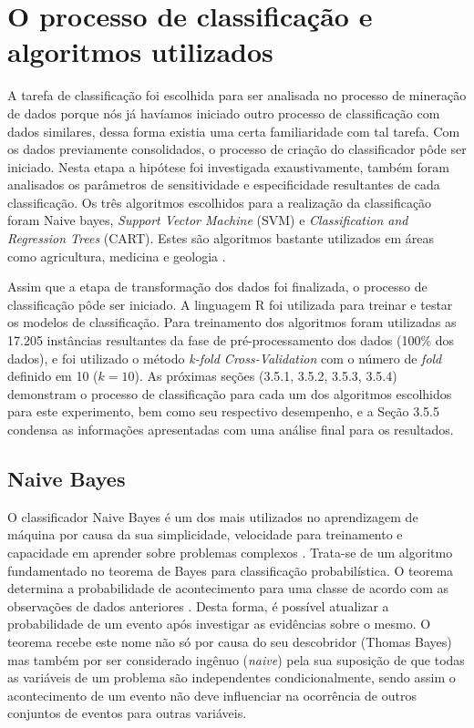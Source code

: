 \section{O processo de classificação e algoritmos utilizados}

A tarefa de classificação foi escolhida para ser analisada no processo de mineração de dados porque nós já havíamos iniciado outro processo de classificação com dados similares, dessa forma existia uma certa familiaridade com tal tarefa. Com os dados previamente consolidados, o processo de criação do classificador pôde ser iniciado. Nesta etapa a hipótese foi investigada exaustivamente, também foram analisados os parâmetros de sensitividade e especificidade resultantes de cada classificação. Os três algoritmos escolhidos para a realização da classificação foram Naive bayes, \textit{Support Vector Machine} (SVM) e \textit{Classification and Regression Trees} (CART). Estes são algoritmos bastante utilizados em áreas como agricultura, medicina e geologia \cite{dong2014nonlinear}.

Assim que a etapa de transformação dos dados foi finalizada, o processo de classificação pôde ser iniciado. A linguagem R foi utilizada para treinar e testar os modelos de classificação. Para treinamento dos algoritmos foram utilizadas as 17.205 instâncias resultantes da fase de pré-processamento dos dados (100\% dos dados), e foi utilizado o método \textit{k-fold Cross-Validation} com o número de \textit{fold} definido em 10 ($k = 10$). As próximas seções (3.5.1, 3.5.2, 3.5.3, 3.5.4) demonstram o processo de classificação para cada um dos algoritmos escolhidos para este experimento, bem como seu respectivo desempenho, e a Seção 3.5.5 condensa as informações apresentadas com uma análise final para os resultados.

\subsection{Naive Bayes}
O classificador Naive Bayes é um dos mais utilizados no aprendizagem de máquina por causa da sua simplicidade, velocidade para treinamento e capacidade em aprender sobre problemas complexos \cite{dong2014nonlinear,zhang2004optimality,chakrabarti2002mining}. Trata-se de um algoritmo fundamentado no teorema de Bayes para classificação probabilística. O teorema determina a probabilidade de acontecimento para uma classe de acordo com as observações de dados anteriores \cite{Aggarwal2015}. Desta forma, é possível atualizar a probabilidade de um evento após investigar as evidências sobre o mesmo. O teorema recebe este nome não só por causa do seu descobridor (Thomas Bayes) mas também por ser considerado ingênuo (\textit{naive}) pela sua suposição de que todas as variáveis de um problema são independentes condicionalmente, sendo assim o acontecimento de um evento não deve influenciar na ocorrência de outros conjuntos de eventos para outras variáveis.

